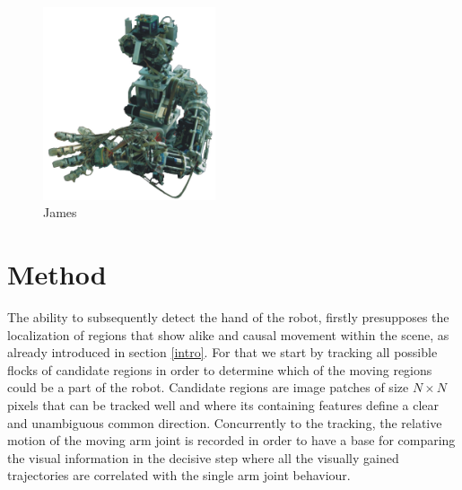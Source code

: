 \documentclass[conference]{IEEEtran}
\begin{document}
\begin{figure}
\centering
\includegraphics[width=2in]{imgs/james.pdf}
\caption{James}
\label{figJames}
\end{figure}

%
%
\section{Method}\label{method}
The ability to subsequently detect the hand of the robot, firstly presupposes the localization of regions that show alike and causal movement within the scene, as already introduced in section \ref{intro}. For that we start by tracking all possible flocks of candidate regions in order to determine which of the moving regions could be a part of the robot. Candidate regions are image patches of size $N \times N$ pixels that can be tracked well and where its containing features define a clear and unambiguous common direction. Concurrently to the tracking, the relative motion of the moving arm joint is recorded in order to have a base for comparing the visual information in the decisive step where all the visually gained trajectories are correlated with the single arm joint behaviour. 
%
%
%
%
\end{document}
